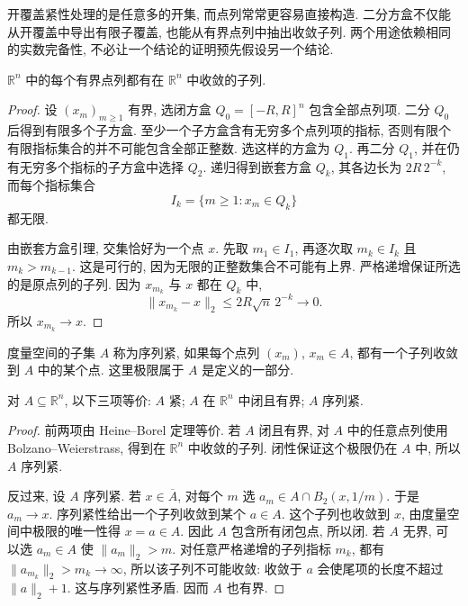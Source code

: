 开覆盖紧性处理的是任意多的开集, 而点列常常更容易直接构造. 二分方盒不仅能从开覆盖中导出有限子覆盖, 也能从有界点列中抽出收敛子列. 两个用途依赖相同的实数完备性, 不必让一个结论的证明预先假设另一个结论.

\begin{theorem}
\label{ch:eucompact:bw}
$\mathbb{R}^n$ 中的每个有界点列都有在 $\mathbb{R}^n$ 中收敛的子列.
\end{theorem}
\begin{proof}
设 $(x_m)_{m\geq1}$ 有界, 选闭方盒 $Q_0=[-R,R]^n$ 包含全部点列项. 二分 $Q_0$ 后得到有限多个子方盒. 至少一个子方盒含有无穷多个点列项的指标, 否则有限个有限指标集合的并不可能包含全部正整数. 选这样的方盒为 $Q_1$. 再二分 $Q_1$, 并在仍有无穷多个指标的子方盒中选择 $Q_2$. 递归得到嵌套方盒 $Q_k$, 其各边长为 $2R\,2^{-k}$, 而每个指标集合
\[
 I_k=\{m\geq1:x_m\in Q_k\}
\]
都无限.

由嵌套方盒引理, 交集恰好为一个点 $x$. 先取 $m_1\in I_1$, 再逐次取 $m_k\in I_k$ 且 $m_k>m_{k-1}$. 这是可行的, 因为无限的正整数集合不可能有上界. 严格递增保证所选的是原点列的子列. 因为 $x_{m_k}$ 与 $x$ 都在 $Q_k$ 中,
\[
 \|x_{m_k}-x\|_2\leq2R\sqrt n\,2^{-k}\longrightarrow0.
\]
所以 $x_{m_k}\to x$.
\end{proof}

\begin{definition}[序列紧]
度量空间的子集 $A$ 称为序列紧, 如果每个点列 $(x_m)$, $x_m\in A$, 都有一个子列收敛到 $A$ 中的某个点. 这里极限属于 $A$ 是定义的一部分.
\end{definition}

\begin{theorem}[欧氏空间中的序列紧性]
\label{ch:eucompact:sequential-hb}
对 $A\subseteq\mathbb{R}^n$, 以下三项等价: $A$ 紧; $A$ 在 $\mathbb{R}^n$ 中闭且有界; $A$ 序列紧.
\end{theorem}
\begin{proof}
前两项由 Heine--Borel 定理等价. 若 $A$ 闭且有界, 对 $A$ 中的任意点列使用 Bolzano--Weierstrass, 得到在 $\mathbb{R}^n$ 中收敛的子列. 闭性保证这个极限仍在 $A$ 中, 所以 $A$ 序列紧.

反过来, 设 $A$ 序列紧. 若 $x\in\overline A$, 对每个 $m$ 选 $a_m\in A\cap B_2(x,1/m)$. 于是 $a_m\to x$. 序列紧性给出一个子列收敛到某个 $a\in A$. 这个子列也收敛到 $x$, 由度量空间中极限的唯一性得 $x=a\in A$. 因此 $A$ 包含所有闭包点, 所以闭. 若 $A$ 无界, 可以选 $a_m\in A$ 使 $\|a_m\|_2>m$. 对任意严格递增的子列指标 $m_k$, 都有 $\|a_{m_k}\|_2>m_k\to\infty$, 所以该子列不可能收敛: 收敛于 $a$ 会使尾项的长度不超过 $\|a\|_2+1$. 这与序列紧性矛盾. 因而 $A$ 也有界.
\end{proof}

